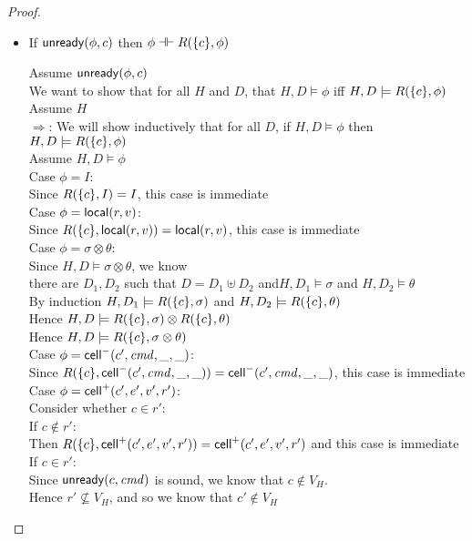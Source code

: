 \begin{proof}
\begin{itemize}
\item If $\mathsf{unready}({\phi}, {c})$ then $\phi \dashv\vdash R(\{{c}\}, \phi)$
\begin{tabbedproof}
\oo Assume $\mathsf{unready}({\phi}, {c})$ \\
\oo We want to show that for all $H$ and $D$, that $H, D \models \phi$ iff $H, D \models R(\{{c}\}, \phi)$ \\
\oo Assume $H$ \\
\oo $\Rightarrow$: We will show inductively that for all $D$, if $H, D \models \phi$ then $H, D \models R(\{{c}\}, \phi)$ \\ 
\ooo Assume $H, D \models \phi$ \\ 
\ooo Case $\phi = I$: \\
\oooo Since $R(\{{c}\}, I) = I$, this case is immediate \\
\ooo Case $\phi = \mathsf{local}({r}, {v})$: \\
\oooo Since $R(\{{c}\}, \mathsf{local}({r}, {v})) = \mathsf{local}({r}, {v})$, this case is immediate \\
\ooo Case $\phi = \sigma \otimes \theta$: \\
\oooo Since $H, D \models \sigma \otimes \theta$, we know  \\
\ooox there are $D_1, D_2$ such that $D = D_1 \uplus D_2$ and$H, D_1 \models \sigma$ and $H, D_2 \models \theta$ \\
\oooo By induction $H, D_1 \models R(\{{c}\}, \sigma)$ and $H, D_2 \models R(\{{c}\}, \theta)$ \\
\oooo Hence $H, D \models R(\{{c}\}, \sigma) \otimes R(\{{c}\}, \theta)$ \\
\oooo Hence $H, D \models R(\{{c}\}, \sigma \otimes \theta)$ \\
\ooo Case $\phi = \mathsf{cell}^{-}({c'}, {\mathit{cmd}}, {\_}, {\_})$: \\
\oooo Since $R(\{{c}\}, \mathsf{cell}^{-}({c'}, {\mathit{cmd}}, {\_}, {\_})) = \mathsf{cell}^{-}({c'}, {\mathit{cmd}}, {\_}, {\_})$, this case is immediate \\
\ooo Case $\phi = \mathsf{cell}^{+}({c'}, {e'}, {v'}, {r'})$: \\
\oooo Consider whether $c \in r'$: \\
\oooo If $c \not\in r'$: \\
\ooooo Then $R(\{{c}\}, \mathsf{cell}^{+}({c'}, {e'}, {v'}, {r'})) = \mathsf{cell}^{+}({c'}, {e'}, {v'}, {r'})$ and this case is immediate \\
\oooo If $c \in r'$: \\
\ooooo Since $\mathsf{unready}({c}, {\mathit{cmd}})$ is sound, we know that $c \not\in V_H$. \\ 
\ooooo Hence $r' \not\subseteq V_H$, and so we know that $c' \not\in V_H$ \\

\end{tabbedproof}
\end{itemize}
\end{proof}
